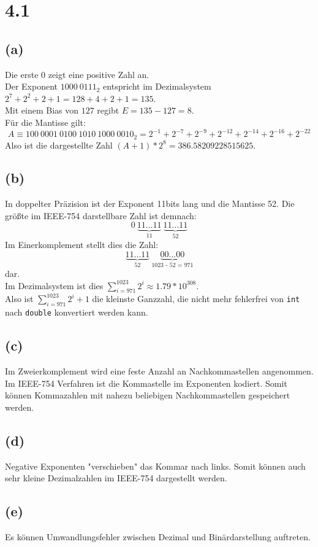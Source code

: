\section*{4.1}
\subsection*{(a)}
Die erste $0$ zeigt eine positive Zahl an.\\
Der Exponent $1000\ 0111_2$ entspricht im Dezimalsystem $2^7 + 2^2 + 2 + 1 = 128 + 4 + 2 + 1 = 135$.\\
Mit einem Bias von $127$ regibt $E = 135 - 127 = 8$.\\
Für die Mantisse gilt: 
$$A \equiv 100\ 0001\ 0100\ 1010\ 1000\ 0010_2 = 2^{-1} + 2^{-7} + 2^{-9} + 2^{-12} + 2^{-14} + 2^{-16} + 2^{-22}$$
Also ist die dargestellte Zahl $(A + 1) * 2^8 = 386.58209228515625$.

\subsection*{(b)}
In doppelter Präzision ist der Exponent 11bits lang und die Mantisse 52. Die größte im IEEE-754 darstellbare Zahl ist demnach:
$$0\ \underbrace{11...11}_\text{11}\ \underbrace{11...11}_\text{52}$$
Im Einerkomplement stellt dies die Zahl:
$$\underbrace{11...11}_\text{52}\ \underbrace{00...00}_\text{1023 - 52 = 971}$$
dar.\\
Im Dezimalsystem ist dies $\sum_{i = 971}^{1023} 2^i \approx 1.79 * 10^{308}$.\\
Also ist $\sum_{i = 971}^{1023} 2^i + 1$ die kleinste Ganzzahl, die nicht mehr fehlerfrei von \verb+int+ nach \verb+double+ konvertiert werden kann.

\subsection*{(c)}
Im Zweierkomplement wird eine feste Anzahl an Nachkommastellen angenommen. Im IEEE-754 Verfahren ist die Kommastelle im Exponenten kodiert. Somit können Kommazahlen mit nahezu  beliebigen Nachkommastellen gespeichert werden.

\subsection*{(d)}
Negative Exponenten "verschieben" das Kommar nach links. Somit können auch sehr kleine Dezimalzahlen im IEEE-754 dargestellt werden.

\subsection*{(e)}
Es können Umwandlungsfehler zwischen Dezimal und Binärdarstellung auftreten.

